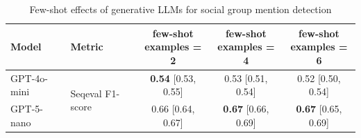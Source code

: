 \begin{table}[htbp]
\centering
\begin{tabular}{llccc}
\toprule
Model & Metric & \makecell{few-shot\\examples = 2} & \makecell{few-shot\\examples = 4} & \makecell{few-shot\\examples = 6} \\
\midrule
GPT-4o-mini & \multirow{2}{*}{Seqeval F1-score} & \textbf{0.54} [0.53, 0.55] & 0.53 [0.51, 0.54] & 0.52 [0.50, 0.54] \\
GPT-5-nano &  & 0.66 [0.64, 0.67] & \textbf{0.67} [0.66, 0.69] & \textbf{0.67} [0.65, 0.69] \\
\bottomrule
\end{tabular}
\caption{Few-shot effects of generative LLMs for social group mention detection}
\label{tab:seqeval_dev_fs}
\end{table}